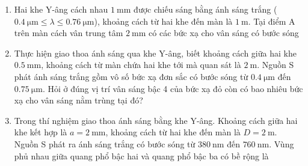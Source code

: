 \begin{enumerate}
{	
	}
		\item
	{
		Hai khe Y-âng cách nhau $\SI{1}{\milli \meter}$ được chiếu sáng bằng ánh sáng trắng ($\SI{0.4}{\micro \meter} \leq \lambda \leq \SI{0.76}{\micro \meter}$), khoảng cách từ hai khe đến màn là $\SI{1}{\meter}$. Tại điểm A trên màn cách vân trung tâm $\SI{2}{\milli \meter}$ có các bức xạ cho vân sáng có bước sóng
	}
		\item
	{
		Thực hiện giao thoa ánh sáng qua khe Y-âng, biết khoảng cách giữa hai khe $\SI{0.5}{\milli \meter}$, khoảng cách từ màn chứa hai khe tới mà quan sát là $\SI{2}{\meter}$. Nguồn S phát ánh sáng trắng gồm vô số bức xạ đơn sắc có bước sóng từ $\SI{0.4}{\micro \meter}$ đến $\SI{0.75}{\micro \meter}$. Hỏi ở đúng vị trí vân sáng bậc 4 của bức xạ đỏ còn có bao nhiêu bức xạ cho vân sáng nằm trùng tại đó?
	}
		\item
	{
		Trong thí nghiệm giao thoa ánh sáng bằng khe Y-âng. Khoảng cách giữa hai khe kết hợp là $a=\SI{2}{\milli \meter}$, khoảng cách từ hai khe đến màn là $D=\SI{2}{\meter}$. Nguồn S phát ra ánh sáng trắng có bước sóng từ $\SI{380}{\nano \meter}$ đến $\SI{760}{\nano \meter}$. Vùng phủ nhau giữa quang phổ bậc hai và quang phổ bậc ba có bề rộng là
	}
\end{enumerate}
